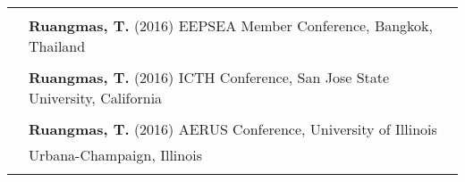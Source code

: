 \documentclass[letterpaper,11pt,oneside]{article}\usepackage[]{graphicx}\usepackage[]{xcolor}
\begin{document}
\begin{tabular}{p{1.2in} l}
                        & \\
                        & \textbf{Ruangmas, T.} (2016) EEPSEA Member Conference, Bangkok, Thailand \\
                        & \\
                        & \textbf{Ruangmas, T.} (2016) ICTH Conference, San Jose State University, California \\
                        & \\
                        & \textbf{Ruangmas, T.} (2016) AERUS Conference, University of Illinois \\
                        & Urbana-Champaign, Illinois \\
                        & \\
\end{tabular}
\end{document}
